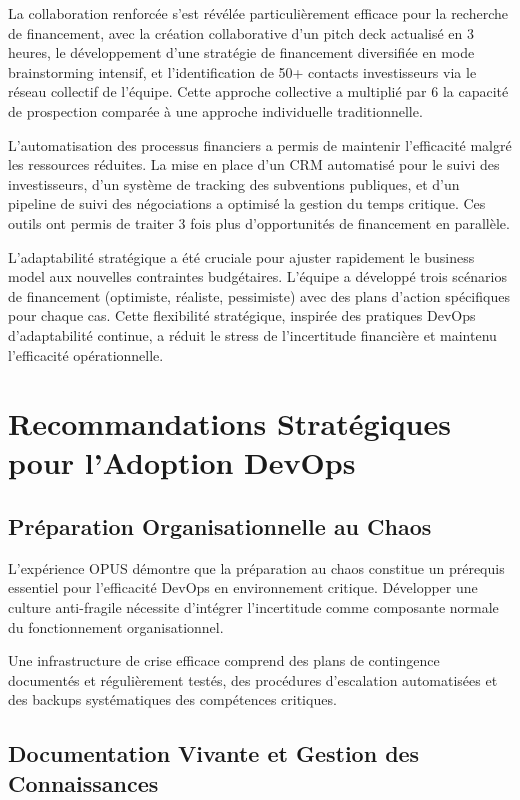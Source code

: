 \documentclass[12pt,a4paper]{article}
\begin{document}
La collaboration renforcée s'est révélée particulièrement efficace pour la recherche de financement, avec la création collaborative d'un pitch deck actualisé en 3 heures, le développement d'une stratégie de financement diversifiée en mode brainstorming intensif, et l'identification de 50+ contacts investisseurs via le réseau collectif de l'équipe. Cette approche collective a multiplié par 6 la capacité de prospection comparée à une approche individuelle traditionnelle.

L'automatisation des processus financiers a permis de maintenir l'efficacité malgré les ressources réduites. La mise en place d'un CRM automatisé pour le suivi des investisseurs, d'un système de tracking des subventions publiques, et d'un pipeline de suivi des négociations a optimisé la gestion du temps critique. Ces outils ont permis de traiter 3 fois plus d'opportunités de financement en parallèle.

L'adaptabilité stratégique a été cruciale pour ajuster rapidement le business model aux nouvelles contraintes budgétaires. L'équipe a développé trois scénarios de financement (optimiste, réaliste, pessimiste) avec des plans d'action spécifiques pour chaque cas. Cette flexibilité stratégique, inspirée des pratiques DevOps d'adaptabilité continue, a réduit le stress de l'incertitude financière et maintenu l'efficacité opérationnelle.

\section{Recommandations Stratégiques pour l'Adoption DevOps}

\subsection{Préparation Organisationnelle au Chaos}

L'expérience OPUS démontre que la préparation au chaos constitue un prérequis essentiel pour l'efficacité DevOps en environnement critique. Développer une culture anti-fragile nécessite d'intégrer l'incertitude comme composante normale du fonctionnement organisationnel.

Une infrastructure de crise efficace comprend des plans de contingence documentés et régulièrement testés, des procédures d'escalation automatisées et des backups systématiques des compétences critiques.

\subsection{Documentation Vivante et Gestion des Connaissances}
\end{document}
